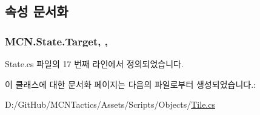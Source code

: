 \subsection{속성 문서화}
\subsubsection[{\texorpdfstring{Target}{Target}}]{ M\+C\+N.\+State.\+Target\hspace{0.3cm}{\ttfamily [get]}, {\ttfamily [protected]}, {\ttfamily [inherited]}}\hypertarget{class_m_c_n_1_1_state_a79a563b32f183c9adc9a96679fc57eb8}{}\label{class_m_c_n_1_1_state_a79a563b32f183c9adc9a96679fc57eb8}


State.\+cs 파일의 17 번째 라인에서 정의되었습니다.



이 클래스에 대한 문서화 페이지는 다음의 파일로부터 생성되었습니다.\+:\begin{DoxyCompactItemize}
\item 
D\+:/\+Git\+Hub/\+M\+C\+N\+Tactics/\+Assets/\+Scripts/\+Objects/\hyperlink{_tile_8cs}{Tile.\+cs}\end{DoxyCompactItemize}
